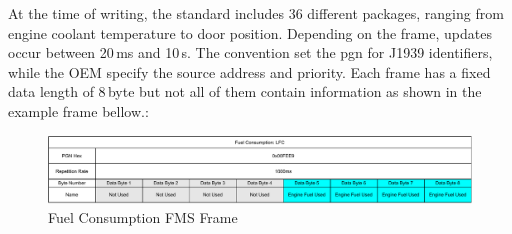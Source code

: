 At the time of writing, the standard includes 36 different packages, ranging from engine coolant temperature to door position.  Depending on the frame, updates occur between 20\,ms and 10\,s. The convention set the \acrfull{pgn} for J1939 identifiers, while the OEM specify the source address and priority. Each frame has a fixed data length of 8\,byte but not all of them contain information as shown in the example frame bellow.\cite{fms-standard-description}:

\begin{figure}[h!]
	\centering
	\hfuzz=11.0pt
	\includegraphics[width=\textwidth]{images/fms-frame}
	\caption{Fuel Consumption FMS Frame}
	\label{fig:fms-frame}
\end{figure}

